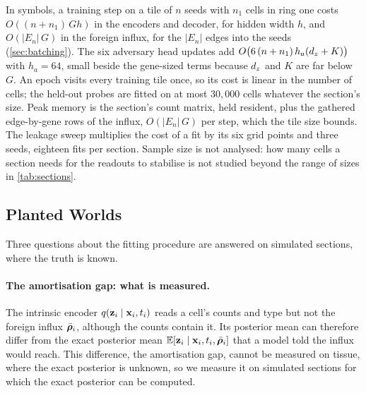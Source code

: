 In symbols, a training step on a tile of $n$ seeds with $n_1$ cells in ring one costs $O((n + n_1)\,G h)$ in the encoders and decoder, for hidden width $h$, and $O(|E_n|\,G)$ in the foreign influx, for the $|E_n|$ edges into the seeds (\cref{sec:batching}). The six adversary head updates add $O\big(6\,(n + n_1)\,h_a(d_z + K)\big)$ with $h_a = 64$, small beside the gene-sized terms because $d_z$ and $K$ are far below $G$. An epoch visits every training tile once, so its cost is linear in the number of cells; the held-out probes are fitted on at most $30{,}000$ cells whatever the section's size. Peak memory is the section's count matrix, held resident, plus the gathered edge-by-gene rows of the influx, $O(|E_n|\,G)$ per step, which the tile size bounds. The leakage sweep multiplies the cost of a fit by its six grid points and three seeds, eighteen fits per section. Sample size is not analysed: how many cells a section needs for the readouts to stabilise is not studied beyond the range of sizes in \cref{tab:sections}.



\subsection{Planted Worlds}
\label{app:planted}

 Three questions about the fitting procedure are answered on simulated sections, where the truth is known.

\paragraph{The amortisation gap: what is measured.}
The intrinsic encoder $q(\mathbf{z}_i \mid \mathbf{x}_i, t_i)$ reads a cell's counts and type but not the foreign influx $\bar{\boldsymbol{\rho}}_i$, although the counts contain it. Its posterior mean can therefore differ from the exact posterior mean $\operatorname{\mathbb{E}}[\mathbf{z}_i \mid \mathbf{x}_i, t_i, \bar{\boldsymbol{\rho}}_i]$ that a model told the influx would reach. This difference, the amortisation gap, cannot be measured on tissue, where the exact posterior is unknown, so we measure it on simulated sections for which the exact posterior can be computed.

